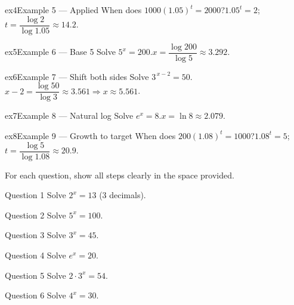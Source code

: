 \documentclass[11pt]{article}
\begin{document}
\begin{example}{ex4}{Example 5 --- Applied}
When does $1000(1.05)^{t}=2000$?\soln $1.05^t=2$; $t=\dfrac{\log 2}{\log 1.05}\approx14.2$.
\end{example}

\begin{example}{ex5}{Example 6 --- Base 5}
Solve $5^{x}=200$.\soln $x=\dfrac{\log 200}{\log 5}\approx3.292$.
\end{example}

\begin{example}{ex6}{Example 7 --- Shift both sides}
Solve $3^{\,x-2}=50$.\soln $x-2=\dfrac{\log 50}{\log 3}\approx3.561\Rightarrow x\approx5.561$.
\end{example}

\begin{example}{ex7}{Example 8 --- Natural log}
Solve $e^{x}=8$.\soln $x=\ln 8\approx2.079$.
\end{example}

\begin{example}{ex8}{Example 9 --- Growth to target}
When does $200(1.08)^{t}=1000$?\soln $1.08^t=5$; $t=\dfrac{\log 5}{\log 1.08}\approx20.9$.
\end{example}

\clearpage
{}
For each question, show all steps clearly in the space provided.

\begin{qbox}{Question 1}
Solve $2^{x}=13$ (3 decimals).\workspace{2.4cm}
\end{qbox}

\begin{qbox}{Question 2}
Solve $5^{x}=100$.\workspace{2.4cm}
\end{qbox}

\begin{qbox}{Question 3}
Solve $3^{x}=45$.\workspace{2.4cm}
\end{qbox}

\begin{qbox}{Question 4}
Solve $e^{x}=20$.\workspace{2.4cm}
\end{qbox}

\begin{qbox}{Question 5}
Solve $2\cdot3^{x}=54$.\workspace{2.4cm}
\end{qbox}

\begin{qbox}{Question 6}
Solve $4^{x}=30$.\workspace{2.4cm}
\end{qbox}
\end{document}
